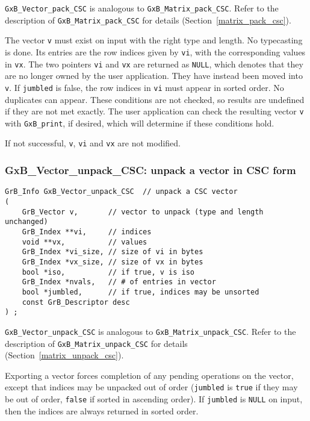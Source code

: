 \documentclass[12pt]{article}
\begin{document}
\noindent
\verb'GxB_Vector_pack_CSC' is analogous to \verb'GxB_Matrix_pack_CSC'.
Refer to the description of \verb'GxB_Matrix_pack_CSC' for details
(Section~\ref{matrix_pack_csc}).

The vector \verb'v' must
exist on input with the right type and length.  No typecasting is done.
Its entries are
the row indices given by \verb'vi', with the corresponding values in \verb'vx'.
The two pointers \verb'vi' and \verb'vx' are returned as \verb'NULL', which
denotes that they are no longer owned by the user application.  They have
instead been moved into \verb'v'.  If \verb'jumbled'
is false, the row indices in \verb'vi' must appear in sorted order.  No
duplicates can appear.  These conditions are not checked, so results are
undefined if they are not met exactly.  The user application can check the
resulting vector \verb'v' with \verb'GxB_print', if desired, which will
determine if these conditions hold.

If not successful, \verb'v', \verb'vi' and
\verb'vx' are not modified.

\newpage
\subsubsection{{\sf GxB\_Vector\_unpack\_CSC:} unpack a vector in CSC form}
\label{vector_unpack_csc}

\begin{mdframed}[userdefinedwidth=6in]
{\footnotesize
\begin{verbatim}
GrB_Info GxB_Vector_unpack_CSC  // unpack a CSC vector
(
    GrB_Vector v,       // vector to unpack (type and length unchanged)
    GrB_Index **vi,     // indices
    void **vx,          // values
    GrB_Index *vi_size, // size of vi in bytes
    GrB_Index *vx_size, // size of vx in bytes
    bool *iso,          // if true, v is iso
    GrB_Index *nvals,   // # of entries in vector
    bool *jumbled,      // if true, indices may be unsorted
    const GrB_Descriptor desc
) ;
\end{verbatim}
} \end{mdframed}

\verb'GxB_Vector_unpack_CSC' is analogous to \verb'GxB_Matrix_unpack_CSC'.
Refer to the description of \verb'GxB_Matrix_unpack_CSC' for details
(Section~\ref{matrix_unpack_csc}).

Exporting a vector forces completion of any pending operations on the vector,
except that indices may be unpacked out of order (\verb'jumbled' is \verb'true'
if they may be out of order, \verb'false' if sorted in ascending order).  If
\verb'jumbled' is \verb'NULL' on input, then the indices are always returned in
sorted order.
\end{document}
